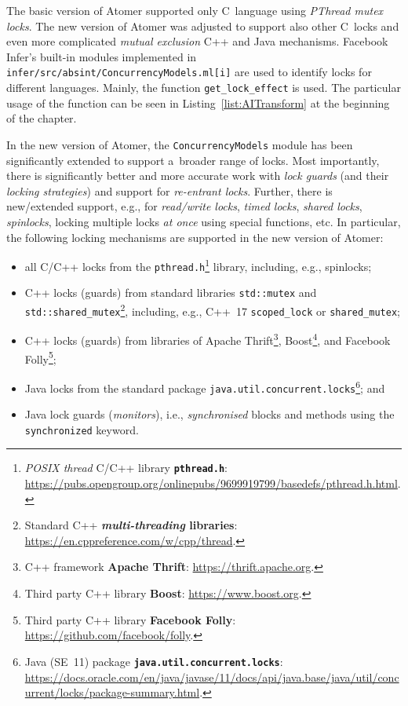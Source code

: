 The basic version of Atomer supported only C~language using \emph{PThread mutex locks}. The new version of Atomer was adjusted to support also other C~locks and even more complicated \emph{mutual exclusion} C++ and Java mechanisms. Facebook Infer's built-in modules implemented in \texttt{infer/src/absint/ConcurrencyModels.ml[i]} are used to identify locks for different languages. Mainly, the function \texttt{get\_lock\_effect} is used. The particular usage of the function can be seen in Listing~\ref{list:AITransform} at the beginning of the chapter.

In the new version of Atomer, the \texttt{ConcurrencyModels} module has been significantly extended to support a~broader range of locks. Most importantly, there is significantly better and more accurate work with \emph{lock guards} (and their \emph{locking strategies}) and support for \emph{re-entrant locks}. Further, there is new/extended support, e.g., for \emph{read/write locks}, \emph{timed locks}, \emph{shared locks}, \emph{spinlocks}, locking multiple locks \emph{at once} using special functions, etc. In particular, the following locking mechanisms are supported in the new version of Atomer:
\begin{itemize}
    \item all C/C++ locks from the \texttt{pthread.h}\footnote{\emph{POSIX thread} C/C++ library \textbf{\texttt{pthread.h}}: \url{https://pubs.opengroup.org/onlinepubs/9699919799/basedefs/pthread.h.html}.} library, including, e.g., spinlocks;
    
    \item C++ locks (guards) from standard libraries \texttt{std::mutex} and \texttt{std::shared\_mutex}\footnote{Standard C++ \textbf{\emph{multi-threading} libraries}: \url{https://en.cppreference.com/w/cpp/thread}.}, including, e.g., C++~17 \texttt{scoped\_lock} or \texttt{shared\_mutex};
    
    \item C++ locks (guards) from libraries of Apache Thrift\footnote{C++ framework \textbf{Apache Thrift}: \url{https://thrift.apache.org}.}, Boost\footnote{Third party C++ library \textbf{Boost}: \url{https://www.boost.org}.}, and Facebook Folly\footnote{Third party C++ library \textbf{Facebook Folly}: \url{https://github.com/facebook/folly}.};
    
    \item Java locks from the standard package \texttt{java.util.concurrent.locks}\footnote{Java (SE~11) package \textbf{\texttt{java.util.concurrent.locks}}: \url{https://docs.oracle.com/en/java/javase/11/docs/api/java.base/java/util/concurrent/locks/package-summary.html}.}; and
    
    \item Java lock guards (\emph{monitors}), i.e., \emph{synchronised} blocks and methods using the \texttt{synchronized} keyword.
\end{itemize}



